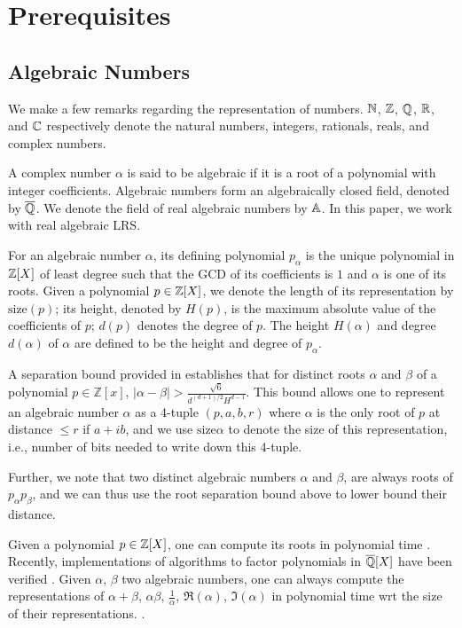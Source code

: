 \section{Prerequisites}
\label{section:prelims}
\subsection{Algebraic Numbers}
We make a few remarks regarding the representation of numbers. $\mathbb{N}$, $\mathbb{Z}$, $\mathbb{Q}$, $\mathbb{R}$, and $\mathbb{C}$ respectively denote the natural numbers, integers, rationals, reals, and complex numbers. 

A complex number $\alpha$ is said to be algebraic if it is a root of a polynomial with integer coefficients. Algebraic numbers form an algebraically closed field, denoted by $\overline{\mathbb{Q}}$. We denote the field of real algebraic numbers by $\mathbb{A}$. In this paper, we work with real algebraic LRS.

For an algebraic number $\alpha$, its defining polynomial $p_\alpha$ is the unique polynomial in $\mathbb{Z}[X]$ of least degree such that the GCD of its coefficients is $1$ and $\alpha$ is one of its roots.
Given a polynomial $p \in \mathbb{Z}[X]$, we denote the length of its representation by $\text{size}(p)$; its height, denoted by $H(p)$, is the maximum absolute value of the coefficients of $p$; $d(p)$ denotes the degree of $p$. The height $H(\alpha)$ and degree $d(\alpha)$ of $\alpha$ are defined to be the height and degree of $p_\alpha$.

A separation bound provided in \cite{mignottecon} establishes that for distinct roots $\alpha$ and $\beta$ of a polynomial $p \in \mathbb{Z}[x]$,
$|\alpha - \beta| > \frac{\sqrt{6}}{d^{(d+1)/2}H^{d-1}}$.
This bound allows one to represent an algebraic number $\alpha$ as a 4-tuple $(p,a,b,r)$ where $\alpha$ is the only root of $p$ at distance $\leq r$ if $a+ib$, and we use $\text{size}{\alpha}$ to denote the size of this representation, i.e., number of bits needed to write down this 4-tuple.

Further, we note that two distinct algebraic numbers $\alpha$ and $\beta$, are always roots of $p_\alpha p_\beta$, and we can thus use the root separation bound above to lower bound their distance.

Given a polynomial $p\in \mathbb{Z}[X]$, one can compute its roots in polynomial time \cite{findroots1operate1}. Recently, implementations of algorithms to factor polynomials in $\overline{\mathbb{Q}}[X]$ have been verified \cite{factor-algebraic}. Given $\alpha$, $\beta$ two algebraic numbers, one can always compute the representations of $\alpha+\beta$, $\alpha\beta$, $\frac 1 \alpha$, $\Re(\alpha)$, $\Im(\alpha)$ in polynomial time wrt the size of their representations. \cite{findroots1operate1,findroots2operate2}.

